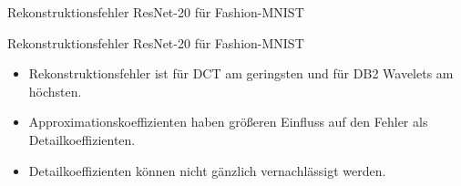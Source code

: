 \documentclass[aspectratio=169, 12pt]{beamer}
\begin{document}
\begin{frame}{Rekonstruktionsfehler ResNet-20 für Fashion-MNIST}
  \begin{figure}
\end{figure}
\end{frame}

\begin{frame}{Rekonstruktionsfehler ResNet-20 für Fashion-MNIST}
  \begin{figure}
    \vspace{-1.7cm}
      \begin{figure}
      \end{figure}
  \end{figure}
  \leavevmode
  \vspace{-1.0cm}
  \begin{itemize}
    \item Rekonstruktionsfehler ist für DCT am geringsten und für DB2 Wavelets am höchsten.
    \item Approximationskoeffizienten haben größeren Einfluss auf den Fehler als Detailkoeffizienten.
    \item Detailkoeffizienten können nicht gänzlich vernachlässigt werden.
  \end{itemize}
\end{frame}
\end{document}

